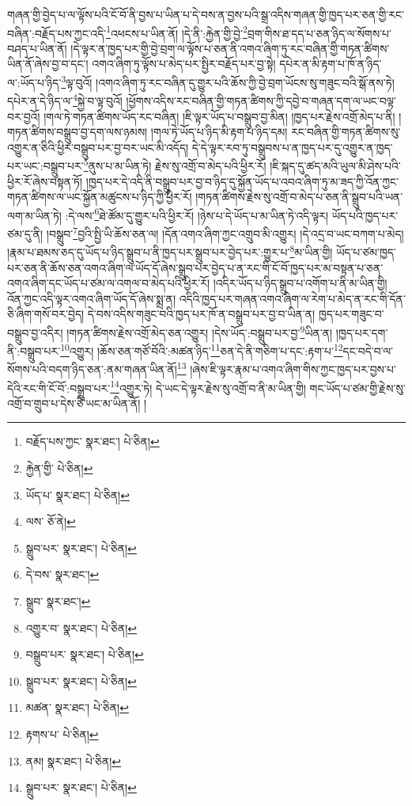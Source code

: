 གཞན་གྱི་བྱེད་པ་ལ་ལྟོས་པའི་ངོ་བོ་ནི་བྱས་པ་ཡིན་པ་དེ་བས་ན་བྱས་པའི་སྒྲ་འདིས་གཞན་གྱི་ཁྱད་པར་ཅན་གྱི་རང་བཞིན་:བརྗོད་པས་ཀྱང་འདི་\footnote{བརྗོད་པས་ཀྱང་  སྣར་ཐང་།  པེ་ཅིན། }འཕངས་པ་ཡིན་ནོ། །དེ་ནི་:རྐྱེན་གྱི་བྱེ་\footnote{རྐྱེན་གྱི་  པེ་ཅིན། }བྲག་གིས་ཐ་དད་པ་ཅན་ཉིད་ལ་སོགས་པ་བཤད་པ་ཡིན་ནོ། །དེ་ལྟར་ན་ཁྱད་པར་གྱི་བྱེ་བྲག་ལ་ལྟོས་པ་ཅན་ནི་འགའ་ཞིག་ཏུ་རང་བཞིན་གྱི་གཏན་ཚིགས་ཡིན་ནོ་ཞེས་བྱ་བ་དང་། འགའ་ཞིག་ཏུ་ལྟོས་པ་མེད་པར་སྤྱིར་བརྗོད་པར་བྱ་སྟེ། དཔེར་ན་མི་རྟག་པ་ཁོ་ན་ཉིད་ལ་:ཡོད་པ་ཉིད་\footnote{ཡོད་པ་  སྣར་ཐང་།  པེ་ཅིན། }ལྟ་བུའོ། །འགའ་ཞིག་ཏུ་རང་བཞིན་དུ་གྱུར་པའི་ཆོས་ཀྱི་བྱེ་བྲག་ཡོངས་སུ་གཟུང་བའི་སྒོ་ནས་ཏེ། དཔེར་ན་དེ་ཉིད་ལ་\footnote{ལས་  ཅོ་ནེ། }སྐྱེ་བ་ལྟ་བུའོ། །ཕྱོགས་འདིས་རང་བཞིན་གྱི་གཏན་ཚིགས་ཀྱི་དབྱེ་བ་གཞན་དག་ལ་ཡང་བལྟ་བར་བྱའོ། །གལ་ཏེ་གཏན་ཚིགས་ཡོད་རང་བཞིན། །ཇི་ལྟར་ཡོད་པ་བསྒྲུབ་བྱ་མིན། །ཁྱད་པར་རྗེས་འགྲོ་མེད་པ་ནི། །གཏན་ཚིགས་བསྒྲུབ་བྱ་དག་ལས་ཉམས། །གལ་ཏེ་ཡོད་པ་ཉིད་མི་རྟག་པ་ཉིད་དམ། རང་བཞིན་གྱི་གཏན་ཚིགས་སུ་འགྱུར་ན་ཅིའི་ཕྱིར་བསྒྲུབ་པར་བྱ་བར་ཡང་མི་འདོད། དེ་དེ་ལྟར་རབ་ཏུ་བསྒྲུབས་པ་ན་ཁྱད་པར་དུ་འགྱུར་ན་ཁྱད་པར་ཡང་:བསྒྲུབ་པར་\footnote{སྒྲུབ་པར་  སྣར་ཐང་།  པེ་ཅིན། }ནུས་པ་མ་ཡིན་ཏེ། རྗེས་སུ་འགྲོ་བ་མེད་པའི་ཕྱིར་རོ། །ཇི་སྐད་དུ་ཚད་མའི་ཡུལ་མི་ཤེས་པའི་ཕྱིར་རོ་ཞེས་བསྟན་ཏོ། །ཁྱད་པར་དེ་འདི་ནི་བསྒྲུབ་པར་བྱ་བ་ཉིད་དུ་སྐྱོན་ཡོད་པ་འབའ་ཞིག་ཏུ་མ་ཟད་ཀྱི་འོན་ཀྱང་གཏན་ཚིགས་ལ་ཡང་སྐྱོན་མཚུངས་པ་ཉིད་ཀྱི་ཕྱིར་རོ། །གཏན་ཚིགས་རྗེས་སུ་འགྲོ་བ་མེད་པ་ཅན་ནི་སྒྲུབ་པའི་ཡན་ལག་མ་ཡིན་ཏེ། :དེ་ལས་\footnote{དེ་བས་  སྣར་ཐང་། }ཐེ་ཚོམ་དུ་གྱུར་པའི་ཕྱིར་རོ། །ཉེས་པ་དེ་ཡོད་པ་མ་ཡིན་ཏེ་འདི་ལྟར། ཡོད་པའི་ཁྱད་པར་ཙམ་དུ་ནི། །བསྒྲུབ་\footnote{སྒྲུབ་  སྣར་ཐང་། }བྱའི་སྤྱི་ཡི་ཆོས་ཅན་ལ། །དོན་འགའ་ཞིག་ཀྱང་འགྲུབ་མི་འགྱུར། །དེ་འདྲ་བ་ཡང་བཀག་པ་མེད། །རྣམ་པ་ཐམས་ཅད་དུ་ཡོད་པ་ཉིད་སྒྲུབ་པ་ནི་ཁྱད་པར་སྒྲུབ་པར་བྱེད་པར་:གྱུར་པ་\footnote{འགྱུར་བ་  སྣར་ཐང་།  པེ་ཅིན། }མ་ཡིན་གྱི། ཡོད་པ་ཙམ་ཁྱད་པར་ཅན་ནི་ཆོས་ཅན་འགའ་ཞིག་ལ་ཡོད་དོ་ཞེས་སྒྲུབ་པར་བྱེད་པ་ན་རང་གི་ངོ་བོ་ཁྱད་པར་མ་བསྟན་པ་ཅན་འགའ་ཞིག་དང་ཡོད་པ་ཙམ་ལ་འགལ་བ་མེད་པའི་ཕྱིར་རོ། །འདིར་ཡོད་པ་ཉིད་སྒྲུབ་པ་འགོག་པ་ནི་མ་ཡིན་གྱི། འོན་ཀྱང་འདི་ལྟར་འགའ་ཞིག་ཡོད་དོ་ཞེས་སྨྲ་ན། འདིའི་ཁྱད་པར་གཞན་འགའ་ཞིག་ལ་རེག་པ་མེད་ན་རང་གི་དོན་ཅི་ཞིག་གསོ་བར་བྱེད། དེ་བས་འདིས་གཟུང་བའི་ཁྱད་པར་ཁོ་ན་བསྒྲུབ་པར་བྱ་བ་ཡིན་ན། ཁྱད་པར་གཟུང་བ་བསྒྲུབ་བྱ་འདིར། །གཏན་ཚིགས་རྗེས་འགྲོ་མེད་ཅན་འགྱུར། །དེས་ཡོད་:བསྒྲུབ་པར་བྱ་\footnote{བསྒྲུབ་པར་  སྣར་ཐང་།  པེ་ཅིན། }ཡིན་ན། །ཁྱད་པར་དག་ནི་:བསྒྲུབ་པར་\footnote{སྒྲུབ་པར་  སྣར་ཐང་།  པེ་ཅིན། }འགྱུར། །ཆོས་ཅན་གཙོ་བོའི་:མཚན་ཉིད་\footnote{མཚན་  སྣར་ཐང་།  པེ་ཅིན། }ཅན་དེ་ནི་གཅིག་པ་དང་:རྟག་པ་\footnote{རྟགས་པ་  པེ་ཅིན། }དང་བདེ་བ་ལ་སོགས་པའི་བདག་ཉིད་ཅན་:ནམ་གཞན་ཡིན་ནོ།\footnote{ནམ།  སྣར་ཐང་།  པེ་ཅིན། } །ཞེས་ཇི་ལྟར་རྣམ་པ་འགའ་ཞིག་གིས་ཀྱང་ཁྱད་པར་བྱས་པ་དེའི་རང་གི་ངོ་བོ་:བསྒྲུབ་པར་\footnote{སྒྲུབ་པར་  སྣར་ཐང་།  པེ་ཅིན། }འགྱུར་ཏེ། དེ་ཡང་དེ་ལྟར་རྗེས་སུ་འགྲོ་བ་ནི་མ་ཡིན་གྱི། གང་ཡོད་པ་ཙམ་གྱི་རྗེས་སུ་འགྲོ་བ་གྲུབ་པ་དེས་ཅི་ཡང་མ་ཡིན་ནོ། །

